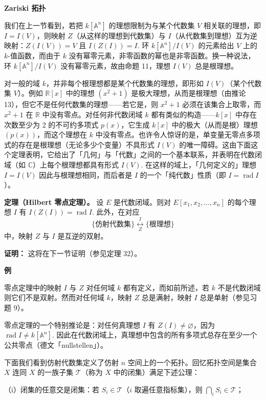 \noindent\textbf{Zariski 拓扑}

我们在上一节看到，若把 \(k[\mathbb{A}^n]\) 的理想限制为与某个代数集 \(V\) 相关联的理想，即 \(I = I(V)\)，则映射 \(Z\)（从这样的理想到代数集）与 \(I\)（从代数集到理想）互为逆映射：\(Z(I(V)) = V\) 且 \(I(Z(I)) = I\). 环 \(k[\mathbb{A}^n]/I(V)\) 的元素给出 \(V\) 上的 \(k\)-值函数，而由于 \(k\) 没有幂零元素，非零函数的幂也是非零函数。换一种说法，环 \(k[\mathbb{A}^n]/I(V)\) 没有幂零元素，故由命题 11，理想 \(I(V)\) 总是根理想。

对一般的域 \(k\)，并非每个根理想都是某个代数集的理想，即形如 \(I(V)\)（某个代数集 \(V\)）。例如 \(\mathbb{R}[x]\) 中的理想 \((x^2+1)\) 是极大理想，从而是根理想（由推论 13），但它不是任何代数集的理想——若它是，则 \(x^2+1\) 必须在该集合上取零，而 \(x^2+1\) 在 \(\mathbb{R}\) 中没有零点。对任何非代数闭域 \(k\) 都有类似的构造——\(k[x]\) 中存在次数至少为 2 的不可约多项式 \(p(x)\)，它生成 \(k[x]\) 中的极大（从而是根）理想 \((p(x))\)，而这个理想在 \(k\) 中没有零点。也许令人惊讶的是，单变量无零点多项式的存在是根理想（无论多少个变量）不具形式 \(I(V)\) 的唯一障碍。这由下面这个定理表明，它给出了「几何」与「代数」之间的一个基本联系，并表明在代数闭域（如 \(\mathbb{C}\)）上每个根理想都具有形式 \(I(V)\). 在这样的域上，「几何定义的」理想 \(I = I(V)\) 因此与根理想相同，而后者是 \(I\) 的一个「纯代数」性质（即 \(I = \operatorname{rad}I\)）。

\noindent\textbf{定理（Hilbert 零点定理）。} 设 \(E\) 是代数闭域。则对 \(E[x_1, x_2, \ldots, x_n]\) 的每个理想 \(I\) 有 \(I(Z(I)) = \operatorname{rad}I\). 此外，在对应
\[
\{\text{仿射代数集}\} \underset{Z}{\overset{I}{\longleftrightarrow}} \{\text{根理想}\}
\]
中，映射 \(Z\) 与 \(I\) 是互逆的双射。

\noindent\textbf{证明：} 这将在下一节证明（参见定理 32）。

\noindent\textbf{例}

零点定理中的映射 \(I\) 与 \(Z\) 对任何域 \(k\) 都有定义，而如前所述，若 \(k\) 不是代数闭域则它们不是双射。然而对任何域 \(k\)，映射 \(Z\) 总是满射，映射 \(I\) 总是单射（参见习题 9）。

零点定理的一个特别推论是：对任何真理想 \(I\) 有 \(Z(I) \neq \varnothing\)，因为 \(\operatorname{rad}I \neq k[\mathbb{A}^n]\). 因此在代数闭域上，真理想中包含的所有多项式总存在至少一个公共零点（德文「nullstellen」）。

下面我们看到仿射代数集定义了仿射 \(n\) 空间上的一个拓扑。回忆拓扑空间是集合 \(X\) 连同 \(X\) 的一族子集 \(\mathcal{T}\)（称为 \(X\) 中的闭集）满足下述公理：

（i）闭集的任意交是闭集：若 \(S_i \in \mathcal{T}\)（\(i\) 取遍任意指标集），则 \(\bigcap_iS_i \in \mathcal{T}\)；

